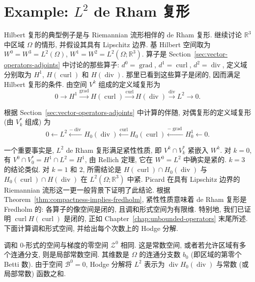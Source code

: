 \section{Example: $L^2$ de Rham 复形}\label{sec:l2-de-rham-complex}

Hilbert 复形的典型例子是与 Riemannian 流形相伴的 de Rham 复形. 继续讨论 $\mathbb R^3$ 中区域 $\Omega$ 的情形, 并假设其具有 Lipschitz 边界. 基 Hilbert 空间取为 $W^0=W^3=L^2(\Omega)$, $W^1=W^2=L^2(\Omega;\mathbb R^3)$. 算子是 Section~\ref{sec:vector-operators-adjoints} 中讨论的那些算子: $d^0=\operatorname{grad}$, $d^1=\operatorname{curl}$, $d^2=\operatorname{div}$, 定义域分别取为 $H^1$, $H(\operatorname{curl})$ 和 $H(\operatorname{div})$. 那里已看到这些算子是闭的, 因而满足 Hilbert 复形的条件. 由空间 $V^k$ 组成的定义域复形为
\begin{equation}\label{eq:l2-de-rham-domain-complex}
0\to H^1\xrightarrow{\operatorname{grad}}H(\operatorname{curl})\xrightarrow{\operatorname{curl}}H(\operatorname{div})\xrightarrow{\operatorname{div}}L^2\to0.
\end{equation}

根据 Section~\ref{sec:vector-operators-adjoints} 中计算的伴随, 对偶复形的定义域复形 (由 $V_k^*$ 组成) 为
\begin{equation}\label{eq:l2-dual-domain-complex}
0\leftarrow L^2\xleftarrow{-\operatorname{div}} H_{0}(\operatorname{div})\xleftarrow{\operatorname{curl}} H_{0}(\operatorname{curl})\xleftarrow{-\operatorname{grad}} H_{0}^1\leftarrow0.
\end{equation}

一个重要事实是, $L^2$ de Rham 复形满足紧性性质, 即 $V^k\cap V_k^*$ 紧嵌入 $W^k$. 对 $k=0$, 有 $V^0\cap V_0^*=H^1\cap L^2=H^1$, 由 Rellich 定理, 它在 $W^0=L^2$ 中确实是紧的. $k=3$ 的结论类似. 对 $k=1$ 和 $2$, 所需结论是 $H(\operatorname{curl})\cap H_{0}(\operatorname{div})$ 与 $ H_{0}(\operatorname{curl})\cap H(\operatorname{div})$ 在 $L^2(\Omega;\mathbb R^3)$ 中紧. Picard  在具有 Lipschitz 边界的 Riemannian 流形这一更一般背景下证明了此结论. 根据 Theorem~\ref{thm:compactness-implies-fredholm}, 紧性性质意味着 de Rham 复形是 Fredholm 的: 各算子的像空间是闭的, 且调和形式空间为有限维. 特别地, 我们已证明 $\operatorname{curl}H(\operatorname{curl})$ 是闭的, 正如 Chapter~\ref{chap:unbounded-operators} 末尾所述. 下面计算调和形式空间, 并给出每个次数上的 Hodge 分解.

调和 $0$-形式的空间与梯度的零空间 $\mathcal Z^0$ 相同. 这是常数空间, 或者若允许区域有多个连通分支, 则是局部常数空间. 其维数是 $\Omega$ 的连通分支数 $b_0$ (即区域的第零个 Betti 数). 由于空间 $\mathcal B^0=0$, Hodge 分解将 $L^2$ 表示为 $\operatorname{div} H_{0}(\operatorname{div})$ 与常数 (或局部常数) 函数之和.


